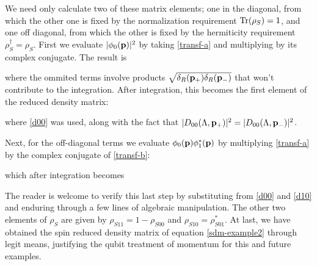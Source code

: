 \documentclass[12pt,a4paper,notitlepage]{report}
\begin{document}
%
We need only calculate two of these matrix elements; one in the diagonal, from which the other one is fixed by the normalization requirement $\Tr(\rho_S) = 1$, and one off diagonal, from which the other is fixed by the hermiticity requirement $\rho_S^\dagger = \rho_S$. First we evaluate $|\phi_0(\vb{p})|^2$ by taking \eqref{transf-a} and multiplying by its complex conjugate. The result is

%
where the ommited terms involve products $\sqrt{\delta_R(\vb{p}_+)\delta_R(\vb{p}_-)}$ that won't contribute to the integration. After integration, this becomes the first element of the reduced density matrix:

where \eqref{d00} was used, along with the fact that $|D_{00}(\Lambda, \vb{p}_+)|^2 = |D_{00}(\Lambda, \vb{p}_-)|^2$.

Next, for the off-diagonal terms we evaluate $\phi_0(\vb{p})\phi_1^*(\vb{p})$ by multiplying \eqref{transf-a} by the complex conjugate of \eqref{transf-b}:

which after integration becomes

%
The reader is welcome to verify this last step by substituting from \eqref{d00} and \eqref{d10} and enduring through a few lines of algebraic manipulation. The other two elements of $\rho_S$ are given by $\rho_{S11} = 1 - \rho_{S00}$ and $\rho_{S10} = \rho_{S01}^*$. At last, we have obtained the spin reduced density matrix of equation \eqref{sdm-example2} through legit means, justifying the qubit treatment of momentum for this and future examples.

\pagebreak


 

\end{document}
